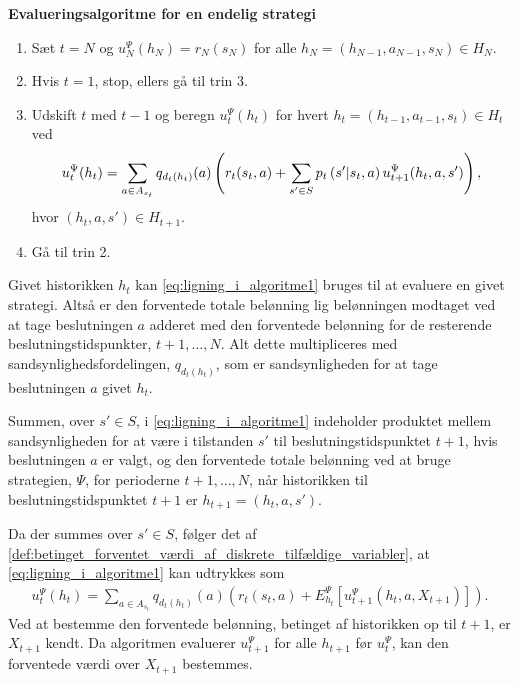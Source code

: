 \begin{alg} \textbf{Evalueringsalgoritme for en endelig strategi} \label{Algoritme1}%
\begin{enumerate}
    \item Sæt $t = N $ og $u_N^\Psi(h_N) = r_N(s_N)$ for alle $h_N = (h_{N-1}, a_{N-1}, s_N) \in H_N$.
    \item Hvis $t = 1$, stop, ellers gå til trin 3.
    \item Udskift $t$ med $t-1$ og beregn $u_t^\Psi(h_t)$ for hvert $h_t = (h_{t-1}, a_{t-1}, s_t)\in H_t$ ved \begin{align}\label{eq:ligning_i_algoritme1}
        \vspace{-0.5cm}u_t^\Psi(h_t) = \sum_{a \in A_{s_t}}q_{d_t(h_t)}(a)\left(r_t(s_t, a) + \sum_{s' \in S} p_t\left(s'|s_t,a\right)u_{t+1}^\Psi(h_t,a,s')\right),
    \end{align}
    hvor $(h_t, a ,s') \in H_{t+1}$.
    \item Gå til trin 2.
\end{enumerate}
\end{alg}

Givet historikken $h_t$ kan \eqref{eq:ligning_i_algoritme1} bruges til at evaluere en givet strategi. Altså er den forventede totale belønning lig belønningen modtaget ved at tage beslutningen $a$ adderet med den forventede belønning for de resterende beslutningstidspunkter, $t+1, \ldots, N$. Alt dette multipliceres med sandsynlighedsfordelingen, $q_{d_t(h_t)}$, som er sandsynligheden for at tage beslutningen $a$ givet $h_t$. 

Summen, over $s' \in S$, i \eqref{eq:ligning_i_algoritme1} indeholder produktet mellem sandsynligheden for at være i tilstanden $s'$ til beslutningstidspunktet $t+1$, hvis beslutningen $a$ er valgt, og den forventede totale belønning ved at bruge strategien, $\Psi$, for perioderne $t+1, \ldots, N$, når historikken til beslutningstidspunktet $t+1$ er $h_{t+1} = (h_t, a, s')$. 

Da der summes over $s' \in S$, følger det af \autoref{def:betinget_forventet_værdi_af_diskrete_tilfældige_variabler}, at \eqref{eq:ligning_i_algoritme1} kan udtrykkes som 
\begin{align}\label{eq:algoritme_ligning_vol2}
    u_t^\Psi(h_t)=\sum_{a \in A_{s_t}}q_{d_t(h_t)}(a)\left(r_t\left(s_t,a\right)+E_{h_t}^\Psi\left[u_{t+1}^\Psi\left(h_t, a, X_{t+1}\right)\right]\right).
\end{align}
Ved at bestemme den forventede belønning, betinget af historikken op til $t+1$, er $X_{t+1}$ kendt. Da algoritmen evaluerer $u^\Psi_{t+1}$ for alle $h_{t+1}$ før $u^\Psi_t$, kan den forventede værdi over $X_{t+1}$ bestemmes.

